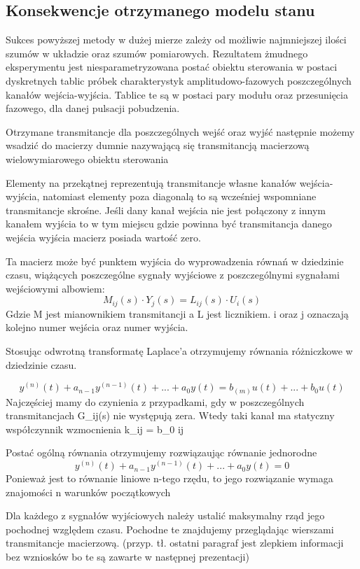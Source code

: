 \documentclass{article}
\begin{document}
	\subsection{Konsekwencje otrzymanego modelu stanu}

		Sukces powyższej metody w dużej mierze zależy od możliwie najmniejszej ilości
		szumów w układzie oraz szumów pomiarowych. Rezultatem żmudnego eksperymentu
		jest niesparametryzowana postać obiektu sterowania w postaci dyskretnych tablic
		próbek charakterystyk amplitudowo-fazowych poszczególnych kanałów wejścia-wyjścia.
		Tablice te są w postaci pary modułu oraz przesunięcia fazowego, dla danej pulsacji
		pobudzenia.

		Otrzymane transmitancje dla poszczególnych wejść oraz wyjść następnie możemy
		wsadzić do macierzy dumnie nazywającą się transmitancją macierzową
		wielowymiarowego obiektu sterowania

		Elementy na przekątnej reprezentują transmitancje własne kanałów
		wejścia-wyjścia, natomiast elementy poza diagonalą to są
		wcześniej wspomniane transmitancje skrośne. Jeśli dany kanał wejścia nie jest
		połączony z innym kanałem wyjścia to w tym miejscu gdzie powinna być
		transmitancja danego wejścia wyjścia macierz posiada wartość zero.

		Ta macierz może być punktem wyjścia do wyprowadzenia równań w dziedzinie czasu,
		wiążących poszczególne sygnały wyjściowe z poszczególnymi sygnałami wejściowymi albowiem:
		\begin{equation}
			 M_{ij}(s) \cdot Y_{j}(s) = L_{ij}(s) \cdot U_{i}(s) 
		\end{equation}
		Gdzie M jest mianownikiem transmitancji a L jest licznikiem.
		i oraz j oznaczają kolejno numer wejścia oraz numer wyjścia.

		Stosując odwrotną transformatę Laplace'a otrzymujemy równania różniczkowe w
		dziedzinie czasu.

		\begin{equation}
			y^{(n)}(t) + a_{n-1} y^{(n-1)}(t) + ... +   a_{0} y(t) = b_{(m)} u(t) + ... + b_{0} u(t)
		\end{equation}
		Najczęściej mamy do czynienia z przypadkami, gdy w poszczególnych
		transmitancjach G_{ij}(s) nie występują zera.
		Wtedy taki kanał ma statyczny współczynnik wzmocnienia k_{ij} = b_{0 ij}

		Postać ogólną równania otrzymujemy rozwiązaując równanie jednorodne
		\begin{equation}
			y^{(n)}(t) + a_{n-1} y^{(n-1)}(t) + ... +   a_{0} y(t) = 0
		\end{equation}
		Ponieważ jest to równanie liniowe n-tego rzędu, to jego rozwiązanie wymaga znajomości
		n warunków początkowych

		Dla każdego z sygnałów wyjściowych należy ustalić maksymalny rząd jego
		pochodnej względem czasu. Pochodne te znajdujemy przeglądając wierszami
		transmitancje macierzową.
		(przyp. tł. ostatni paragraf jest zlepkiem informacji bez wzniosków bo te
		są zawarte w następnej prezentacji)
\end{document}
